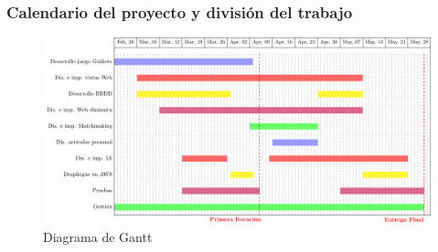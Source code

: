\subsubsection{Calendario del proyecto y división del trabajo}
	\begin{figure}[H]
		\hspace{-3cm}
		\includegraphics[scale=0.8]{figuras/gantt.pdf}
		\caption{Diagrama de Gantt}
	\end{figure}


